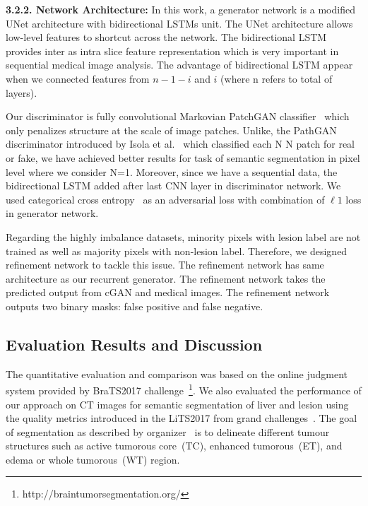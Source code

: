 \documentclass[10pt,twocolumn,letterpaper]{article}
\begin{document}
\textbf{3.2.2. Network Architecture:} In this work, a generator network is a modified UNet architecture with bidirectional LSTMs unit. The UNet architecture allows low-level features to shortcut across the network. The bidirectional LSTM provides inter as intra slice feature representation which is very important in sequential medical image analysis. The advantage of bidirectional LSTM appear when we connected features from $n-1-i$ and $i$ (where n refers to total of layers).

Our discriminator is fully convolutional Markovian PatchGAN classifier~\cite{Phillipimagetoimage2017} which only penalizes structure at the scale of image patches.
Unlike, the PathGAN discriminator introduced by Isola et al.~\cite{Phillipimagetoimage2017} which classified each N  N patch for real or fake, we have achieved better results for task of semantic segmentation in pixel level where we consider N=1. Moreover, since we have a sequential data, the bidirectional LSTM added after last CNN layer in discriminator network. We used categorical cross entropy~\cite{nasr2002cross} as an adversarial loss with combination of $\ell1$ loss in generator network.

Regarding the highly imbalance datasets, minority pixels with lesion label are not trained as well as majority pixels with non-lesion label. Therefore, we designed refinement network to tackle this issue. The refinement network has same architecture as our recurrent generator. The refinement network takes the predicted output from cGAN and medical images. The refinement network outputs two binary masks: false positive and false negative.

\subsection{Evaluation Results and Discussion}\label{evaluation}
The quantitative evaluation and comparison was based on the online judgment system provided by BraTS2017 challenge~\footnote{http://braintumorsegmentation.org/}.
We also evaluated the performance of our approach on CT images for semantic segmentation of liver and lesion using the quality metrics introduced in the LiTS2017 from grand challenges~\cite{heimann2009comparison}.
The goal of segmentation as described by organizer~\cite{Menze2014,Bakasnature2017,Bakastcg2017,Bakaslgg2017} is to delineate different tumour structures such as active tumorous core~(TC), enhanced tumorous~(ET), and edema or whole tumorous~(WT) region.
\end{document}
